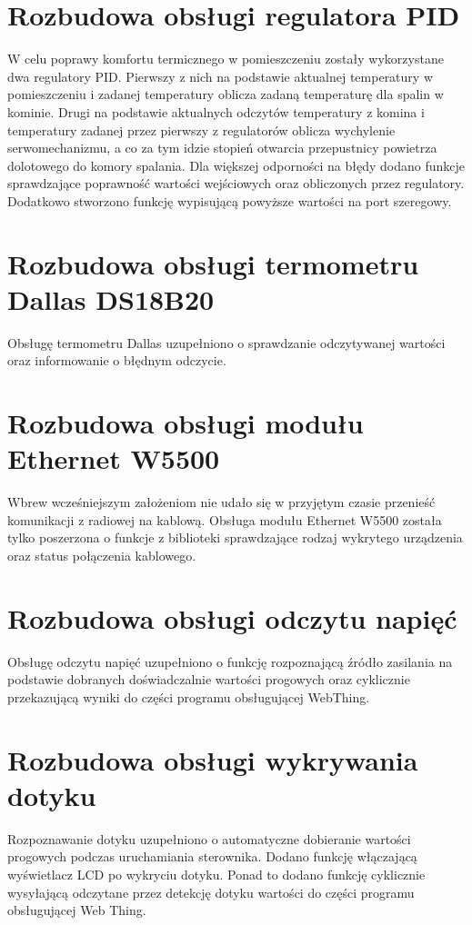 \documentclass[11pt]{report}
\begin{document}
 \section{Rozbudowa obsługi regulatora PID}
 W celu poprawy komfortu termicznego w pomieszczeniu zostały wykorzystane dwa regulatory PID. Pierwszy z nich na podstawie aktualnej temperatury w pomieszczeniu i zadanej temperatury oblicza zadaną temperaturę dla spalin w kominie. Drugi na podstawie aktualnych odczytów temperatury z komina i temperatury zadanej przez pierwszy z regulatorów oblicza wychylenie serwomechanizmu, a co za tym idzie stopień otwarcia przepustnicy powietrza dolotowego do komory spalania.
 Dla większej odporności na błędy dodano funkcje sprawdzające poprawność wartości wejściowych oraz obliczonych przez regulatory. Dodatkowo stworzono funkcję wypisującą powyższe wartości na port szeregowy.

 \section{Rozbudowa obsługi termometru Dallas DS18B20}
 Obsługę termometru Dallas uzupełniono o sprawdzanie odczytywanej wartości oraz informowanie o błędnym odczycie.

 \section{Rozbudowa obsługi modułu Ethernet W5500}
 Wbrew wcześniejszym założeniom nie udało się w przyjętym czasie przenieść komunikacji z radiowej na kablową. Obsługa modułu Ethernet W5500 została tylko poszerzona o funkcje z biblioteki sprawdzające rodzaj wykrytego urządzenia oraz status połączenia kablowego.
 
 \section{Rozbudowa obsługi odczytu napięć}
 Obsługę odczytu napięć uzupełniono o funkcję rozpoznającą źródło zasilania na podstawie dobranych doświadczalnie wartości progowych oraz cyklicznie przekazującą wyniki do części programu obsługującej WebThing.
 
 \section{Rozbudowa obsługi wykrywania dotyku}
 Rozpoznawanie dotyku uzupełniono o automatyczne dobieranie wartości progowych podczas uruchamiania sterownika. Dodano funkcję włączającą wyświetlacz LCD po wykryciu dotyku. Ponad to dodano funkcję cyklicznie wysyłającą odczytane przez detekcję dotyku wartości do części programu obsługującej Web Thing.
 
\end{document}
